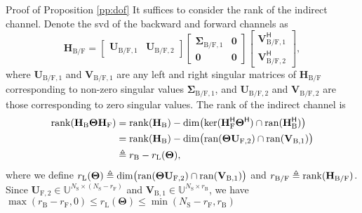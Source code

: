 \documentclass[journal]{IEEEtran}
\begin{document}
\begin{appendix}
	\begin{subsection}{Proof of Proposition \ref{pp:dof}}
		\label{ap:dof}
		It suffices to consider the rank of the indirect channel.
		Denote the \gls{svd} of the backward and forward channels as
		\begin{equation*}
			\mathbf{H}_\mathrm{B/F} = \begin{bmatrix}
				\mathbf{U}_{\mathrm{B/F},1} & \mathbf{U}_{\mathrm{B/F},2}
			\end{bmatrix}
			\begin{bmatrix}
				\mathbf{\Sigma}_{\mathrm{B/F},1} & \mathbf{0} \\
				\mathbf{0}                     & \mathbf{0}
			\end{bmatrix}
			\begin{bmatrix}
				\mathbf{V}_{\mathrm{B/F},1}^\mathsf{H} \\
				\mathbf{V}_{\mathrm{B/F},2}^\mathsf{H}
			\end{bmatrix},
		\end{equation*}
		where $\mathbf{U}_{\mathrm{B/F},1}$ and $\mathbf{V}_{\mathrm{B/F},1}$ are any left and right singular matrices of $\mathbf{H}_\mathrm{B/F}$ corresponding to non-zero singular values $\mathbf{\Sigma}_{\mathrm{B/F},1}$, and $\mathbf{U}_{\mathrm{B/F},2}$ and $\mathbf{V}_{\mathrm{B/F},2}$ are those corresponding to zero singular values.
		The rank of the indirect channel is \cite[(16.5.10.b)]{Hogben2013}
		\begin{equation*}
			\begin{split}
				\operatorname{rank}(\mathbf{H}_\mathrm{B} \mathbf{\Theta} \mathbf{H}_\mathrm{F})
				& = \operatorname{rank}(\mathbf{H}_\mathrm{B}) - \dim \bigl(\ker(\mathbf{H}_\mathrm{F}^\mathsf{H} \mathbf{\Theta}^\mathsf{H}) \cap \operatorname{ran}(\mathbf{H}_\mathrm{B}^\mathsf{H})\bigr) \\
				& = \operatorname{rank}(\mathbf{H}_\mathrm{B}) - \dim \bigl(\operatorname{ran}(\mathbf{\Theta} \mathbf{U}_{\mathrm{F},2}) \cap \operatorname{ran}(\mathbf{V}_{\mathrm{B},1})\bigr) \\
				& \triangleq r_\mathrm{B} - r_\mathrm{L}(\mathbf{\Theta}),
			\end{split}
		\end{equation*}
		where we define $r_\mathrm{L}(\mathbf{\Theta}) \triangleq \dim \bigl(\operatorname{ran}(\mathbf{\Theta} \mathbf{U}_{\mathrm{F},2}) \cap \operatorname{ran}(\mathbf{V}_{\mathrm{B},1})\bigr)$ and $r_\mathrm{B/F} \triangleq \operatorname{rank}(\mathbf{H}_\mathrm{B/F})$.
		Since $\mathbf{U}_{\mathrm{F},2} \in \mathbb{U}^{N_\mathrm{S} \times (N_\mathrm{S} - r_\mathrm{F})}$ and $\mathbf{V}_{\mathrm{B},1} \in \mathbb{U}^{N_\mathrm{S} \times r_\mathrm{B}}$, we have $\max(r_\mathrm{B} - r_\mathrm{F}, 0) \le r_\mathrm{L}(\mathbf{\Theta}) \le \min(N_\mathrm{S} - r_\mathrm{F}, r_\mathrm{B})$

\end{subsection}
\end{appendix}
\end{document}
